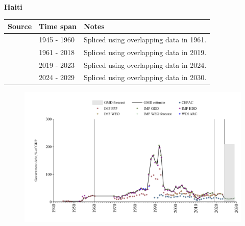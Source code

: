 \documentclass[12pt,a4paper,landscape]{article}
\begin{document}
\begin{adjustbox}{max totalsize={\paperwidth}{\paperheight},center}
\begin{minipage}[t][\textheight][t]{\textwidth}
\vspace*{0.5cm}
{}
\begin{center}
{\Large\bfseries Haiti}
\end{center}
\vspace{0.5cm}
\begin{table}[H]
\centering
\small
\begin{tabular}{|l|l|l|}
\hline
\textbf{Source} & \textbf{Time span} & \textbf{Notes} \\
\hline
\rowcolor{white}\cite{IMF_FPP}& 1945 - 1960 &Spliced using overlapping data in 1961.\\
\rowcolor{lightgray}\cite{IMF_GDD}& 1961 - 2018 &Spliced using overlapping data in 2019.\\
\rowcolor{white}\cite{IMF_FPP}& 2019 - 2023 &Spliced using overlapping data in 2024.\\
\rowcolor{lightgray}\cite{IMF_WEO_forecast}& 2024 - 2029 &Spliced using overlapping data in 2030.\\
\hline
\end{tabular}
\end{table}
\begin{figure}[H]
\centering
\includegraphics[width=\textwidth,height=0.6\textheight,keepaspectratio]{graphs/HTI_govdebt_GDP.pdf}
\end{figure}
\end{minipage}
\end{adjustbox}
\end{document}
